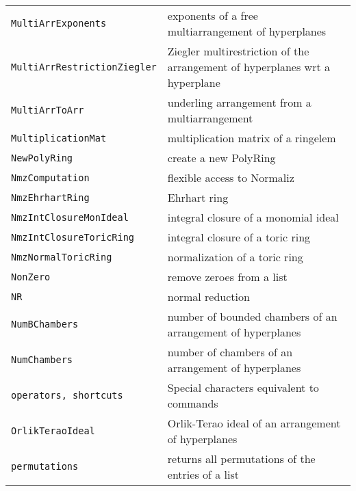 \documentclass[a4paper]{mybook}
\begin{document}
\begin{center}
\begin{longtable}{ll}
{\verb~MultiArrExponents~} &
      exponents of a free multiarrangement of hyperplanes\\
   
{\verb~MultiArrRestrictionZiegler~} &
      Ziegler multirestriction of the arrangement of hyperplanes  wrt a hyperplane\\
   
{\verb~MultiArrToArr~} &
      underling arrangement from a multiarrangement\\
   
{\verb~MultiplicationMat~} &
      multiplication matrix of a ringelem\\
   
{\verb~NewPolyRing~} &
      create a new PolyRing\\
   
{\verb~NmzComputation~} &
      flexible access to Normaliz\\
   
{\verb~NmzEhrhartRing~} &
      Ehrhart ring\\
   
{\verb~NmzIntClosureMonIdeal~} &
      integral closure of a monomial ideal\\
   
{\verb~NmzIntClosureToricRing~} &
      integral closure of a toric ring\\
   
{\verb~NmzNormalToricRing~} &
      normalization of a toric ring\\
   
{\verb~NonZero~} &
      remove zeroes from a list\\
   
{\verb~NR~} &
      normal reduction\\
   
{\verb~NumBChambers~} &
      number of bounded chambers of an arrangement of hyperplanes\\
   
{\verb~NumChambers~} &
      number of chambers of an arrangement of hyperplanes\\
   
{\verb~operators, shortcuts~} &
      Special characters equivalent to commands\\
   
{\verb~OrlikTeraoIdeal~} &
      Orlik-Terao ideal of an arrangement of hyperplanes\\
   
{\verb~permutations~} &
      returns all permutations of the entries of a list\\
   

\end{longtable}
\end{center}
\end{document}
